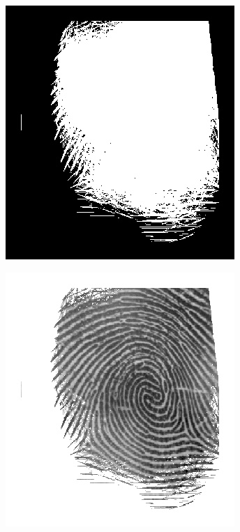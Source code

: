 \documentclass{beamer}
\begin{document}
{\begin{figure}[!ht]
\begin{subfigure}[ht]{0.15\textwidth}
        \end{subfigure}
        \qquad
        \begin{subfigure}[ht]{0.15\textwidth}
            \includegraphics[width=\textwidth]{fingerprints/2004Db2a/1_3_mask.jpg}
        \end{subfigure}
        \qquad
        \begin{subfigure}[ht]{0.15\textwidth}
            \includegraphics[width=\textwidth]{fingerprints/2004Db2a/1_3_filtered.jpg}

\end{subfigure}
\end{figure}}
\end{document}
